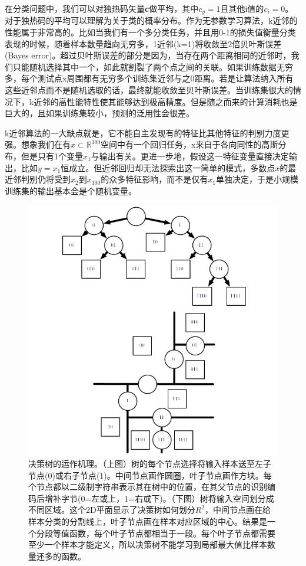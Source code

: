 在分类问题中，我们可以对独热码矢量$\textbf{c}$做平均，其中$c_{y}=1$且其他i值的$c_{i}=0$。对于独热码的平均可以理解为关于类的概率分布。作为无参数学习算法，k近邻的性能属于非常高的。比如当我们有一个多分类任务，并且用0-1的损失值衡量分类表现的时候，随着样本数量趋向无穷多，1近邻(k=1)将收敛至2倍贝叶斯误差(Bayes error)。超过贝叶斯误差的部分是因为，当存在两个距离相同的近邻时，我们只能随机选择其中一个，如此就割裂了两个点之间的关联。如果训练数据无穷多，每个测试点x周围都有无穷多个训练集近邻与之0距离。若是让算法纳入所有这些近邻点而不是随机选取的话，最终就能收敛至贝叶斯误差。当训练集很大的情况下，k近邻的高性能特性使其能够达到极高精度。但是随之而来的计算消耗也是巨大的，且如果训练集较小，预测的泛用性会很差。

k近邻算法的一大缺点就是，它不能自主发现有的特征比其他特征的判别力度更强。想象我们在有$x\subset\mathbb{R}^{100}$空间中有一个回归任务，x来自于各向同性的高斯分布，但是只有1个变量$x_{1}$与输出有关。更进一步地，假设这一特征变量直接决定输出，比如$y=x_{1}$恒成立。但近邻回归却无法探索出这一简单的模式，多数点$x$的最近邻判别仍将受到$x_{2}$到$x_{100}$的众多特征影响，而不是仅有$x_{1}$单独决定，于是小规模训练集的输出基本会是个随机变量。

\begin{figure}[htbp]
   \centering
   \includegraphics[width=6in]{fig/chap5/5_7.png} 
   \caption{决策树的运作机理。（上图）树的每个节点选择将输入样本送至左子节点(0)或右子节点(1)。中间节点画作圆圈，叶子节点画作方块。每个节点都以二级制字符串表示其在树中的位置，在其父节点的识别编码后增补字节(0=左或上，1=右或下)。（下图）树将输入空间划分成不同区域。这个2D平面显示了决策树如何划分$R^{2}$，中间节点画在给样本分类的分割线上，叶子节点画在样本对应区域的中心。结果是一个分段等值函数，每个叶子节点都相当于一段。每个叶子节点都需要至少一个样本才能定义，所以决策树不能学习到局部最大值比样本数量还多的函数。}
   \label{fig:5_7}
\end{figure}

